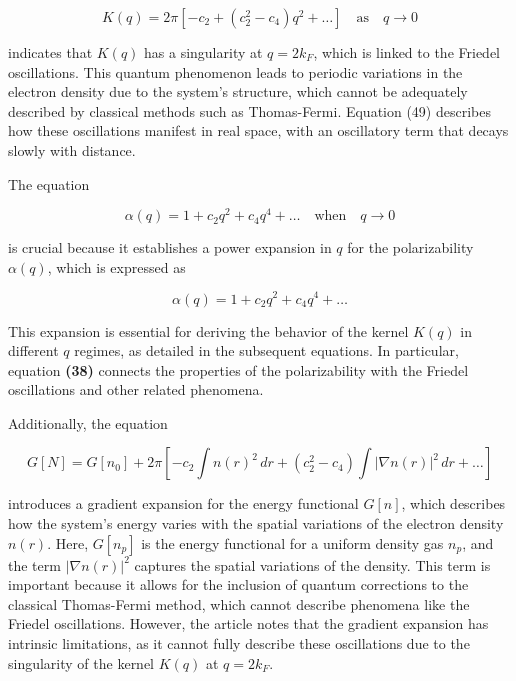 \documentclass[%
 preprint, linenumbers,
 amsmath,amssymb,
 aps, physrev,
]{revtex4-2}
\begin{document}
\begin{equation}
K(q) = 2\pi \left[ -c_2 + (c_2^2 - c_4)q^2 + \dots \right] \quad \text{as} \quad q \to 0
\end{equation}

indicates that \( K(q) \) has a singularity at \( q = 2k_F \), which is linked to the Friedel oscillations. This quantum phenomenon leads to periodic variations in the electron density due to the system's structure, which cannot be adequately described by classical methods such as Thomas-Fermi. Equation (49) describes how these oscillations manifest in real space, with an oscillatory term that decays slowly with distance.

The equation

\begin{equation}
\alpha(q) = 1 + c_2 q^2 + c_4 q^4 + \dots \quad \text{when} \quad q \to 0
\end{equation}

is crucial because it establishes a power expansion in \( q \) for the polarizability \( \alpha(q) \), which is expressed as

\[
\alpha(q) = 1 + c_2 q^2 + c_4 q^4 + \ldots
\]

This expansion is essential for deriving the behavior of the kernel \( K(q) \) in different \( q \) regimes, as detailed in the subsequent equations. In particular, equation \textbf{(38)} connects the properties of the polarizability with the Friedel oscillations and other related phenomena.

Additionally, the equation

\begin{equation}
G[N] = G[n_0] + 2\pi \left[ -c_2 \int n(r)^2 \, dr + (c_2^2 - c_4) \int |\nabla n(r)|^2 \, dr + \dots \right]
\end{equation}

introduces a gradient expansion for the energy functional \( G[n] \), which describes how the system's energy varies with the spatial variations of the electron density \( n(r) \). Here, \( G[n_p] \) is the energy functional for a uniform density gas \( n_p \), and the term \( |\nabla n(r)|^2 \) captures the spatial variations of the density. This term is important because it allows for the inclusion of quantum corrections to the classical Thomas-Fermi method, which cannot describe phenomena like the Friedel oscillations. However, the article notes that the gradient expansion has intrinsic limitations, as it cannot fully describe these oscillations due to the singularity of the kernel \( K(q) \) at \( q = 2k_F \).
\end{document}
